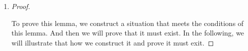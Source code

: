 \documentclass[12pt, notitlepage]{article}
\begin{document}
\begin{enumerate}
\begin{proof}
\begin{enumerate}[(1)]
\begin{enumerate}[(a)]
		\item Next, we prove that $T'$ is a minimum spanning tree. Since substitute $e'$ for $e$ will not affect spanning property of minimum spanning tree, all we need to prove is it takes minimum weight. From the equation $weight(T') = weight(T)-w(e)+w(e')$, since $e'$ is chosen to be the edge with minimum weight, thus $weight(T') < weight(T)$. Therefore $T'$ is a minimum spanning tree.		
	\end{enumerate}
\end{enumerate}
Combine (1) and (2), cut lemma is proved.\\\\
\end{proof}

\item
\begin{proof}
	\mbox{ }
	
	\qquad To prove this lemma, we construct a situation that meets the conditions of this lemma. And then we will prove that it must exist. In the following, we will illustrate that how we construct it and prove it must exit.
	

\end{proof}
\end{enumerate}
\end{document}
